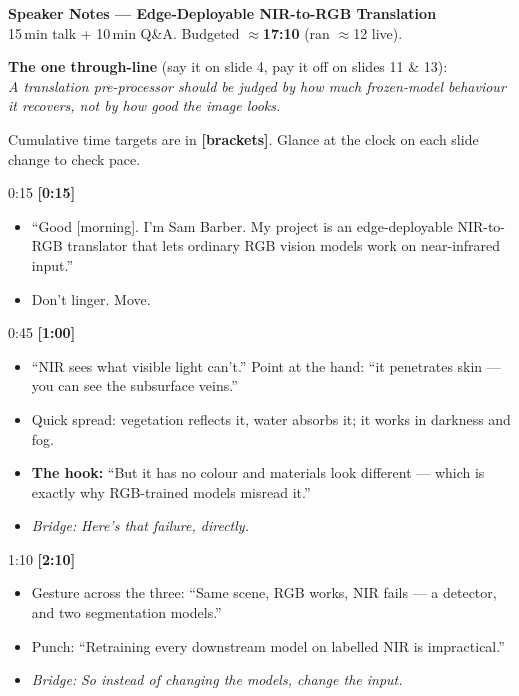 \documentclass[11pt]{article}
\newcommand{\slidehd}[3]{%
  \vspace{6pt}\noindent{\bfseries\textcolor{ICLBlue}{#1}}%
  \hfill{\small #2 \quad\textbf{[#3]}}\\[1pt]}
\newcommand{\bridge}[1]{\textit{\textcolor{ICLBlue}{Bridge:}} \textit{#1}}
\begin{document}
\begin{center}
	{\Large\bfseries\textcolor{ICLBlue}{Speaker Notes --- Edge-Deployable NIR-to-RGB Translation}}\\[4pt]
	{\small 15\,min talk + 10\,min Q\&A. Budgeted $\approx$\textbf{17:10} (ran $\approx$12 live).}
\end{center}

\noindent\textbf{The one through-line} (say it on slide 4, pay it off on slides 11 \& 13):\\
\textit{A translation pre-processor should be judged by how much frozen-model behaviour it recovers, not by how good the image looks.}

\medskip
\noindent Cumulative time targets are in \textbf{[brackets]}. Glance at the clock on each slide change to check pace.

\hrulefill

\slidehd{1. Title}{0:15}{0:15}
\begin{itemize}
	\item ``Good [morning]. I'm Sam Barber. My project is an edge-deployable NIR-to-RGB translator that lets ordinary RGB vision models work on near-infrared input.''
	\item Don't linger. Move.
\end{itemize}

\slidehd{2. Why near-infrared?}{0:45}{1:00}
\begin{itemize}
	\item ``NIR sees what visible light can't.'' Point at the hand: ``it penetrates skin --- you can see the subsurface veins.''
	\item Quick spread: vegetation reflects it, water absorbs it; it works in darkness and fog.
	\item \textbf{The hook:} ``But it has no colour and materials look different --- which is exactly why RGB-trained models misread it.''
	\item \bridge{Here's that failure, directly.}
\end{itemize}

\slidehd{3. The problem}{1:10}{2:10}
\begin{itemize}
	\item Gesture across the three: ``Same scene, RGB works, NIR fails --- a detector, and two segmentation models.''
	\item Punch: ``Retraining every downstream model on labelled NIR is impractical.''
	\item \bridge{So instead of changing the models, change the input.}
\end{itemize}
\end{document}
